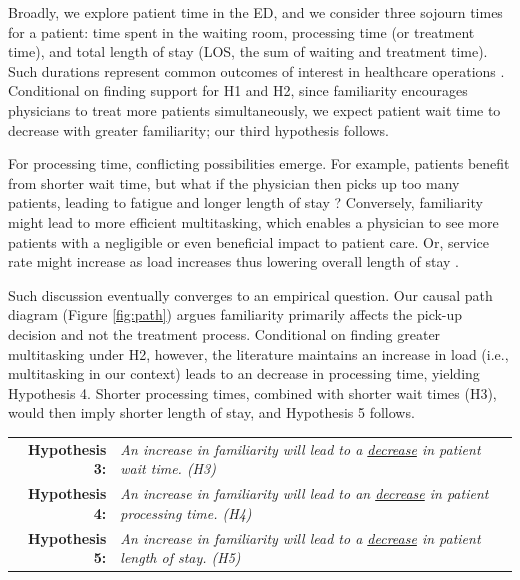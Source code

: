  Broadly, we explore patient time in the ED, and we consider three sojourn times for a patient: time spent in the waiting room, processing time (or treatment time), and total length of stay (LOS, the sum of waiting and treatment time). Such durations represent common outcomes of interest in healthcare operations \citep[e.g.,][]{KC2009,Song2015,BerryJaeker2017,Batt2017,KC2020_tcp}. Conditional on finding support for H1 and H2, since familiarity encourages physicians to treat more patients simultaneously, we expect patient wait time to decrease with greater familiarity; our third hypothesis follows.  
 
 For processing time, conflicting possibilities emerge. For example, patients benefit from shorter wait time, but what if the physician then picks up too many patients, leading to fatigue and longer length of stay \citep{KC2009,Gans2010,StaatsGino2012}? Conversely, familiarity might lead to more efficient multitasking, which enables a physician to see more patients with a negligible \citep{Maestad2010} or even beneficial \citep{KC2014} impact to patient care. Or, service rate might increase as load increases \citep{Schultz1998} thus lowering overall length of stay \citep{Deo2019}. 
 
 Such discussion eventually converges to an empirical question. Our causal path diagram (Figure \ref{fig:path}) argues familiarity primarily affects the pick-up decision and not the treatment process. Conditional on finding greater multitasking under H2, however, the literature \citep[see][]{Delasay2018} maintains an increase in load (i.e., multitasking in our context) leads to an decrease in processing time, yielding Hypothesis 4. Shorter processing times, combined with shorter wait times (H3), would then imply shorter length of stay, and Hypothesis 5 follows.
 
 \medskip \noindent
 \begin{tabularx}{\linewidth}{ r X }
    \textbf{Hypothesis 3:} & \textit{An increase in familiarity will lead to a \underline{decrease} in patient wait time. (H3)} \\
    \textbf{Hypothesis 4:} & \textit{An increase in familiarity will lead to an \underline{decrease} in patient processing time. (H4)} \\
    \textbf{Hypothesis 5:} & \textit{An increase in familiarity will lead to a \underline{decrease} in patient length of stay. (H5)} \\
 \end{tabularx}    %
 


